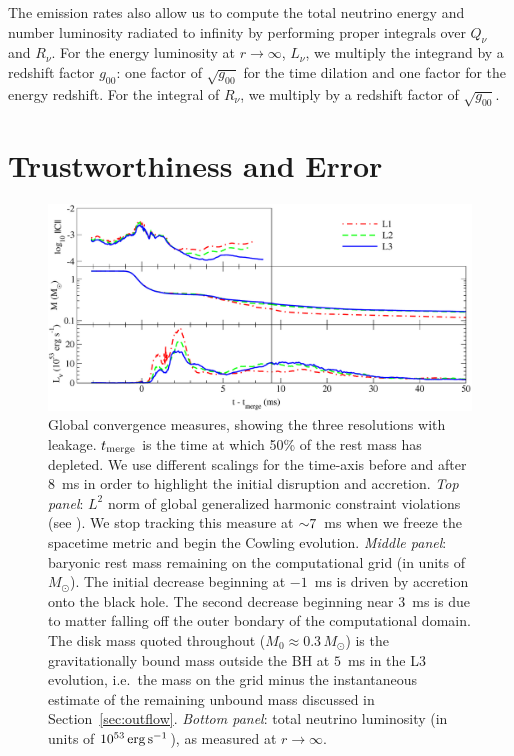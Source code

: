 The emission rates also allow us to compute the total neutrino energy
and number luminosity radiated to infinity by performing proper integrals
over $Q_{\nu}$ and $R_{\nu}$.  For the energy luminosity at $r\rightarrow\infty$, $L_{\nu}$,
we multiply the integrand by a redshift factor $g_{00}$:  one factor of
$\sqrt{g_{00}}$ for the time dilation and one factor for the energy redshift. 
For the integral of $R_{\nu}$, we multiply by a redshift factor of
$\sqrt{g_{00}}$.

\section{Trustworthiness and Error}
\label{sec:grhydroconvergence}

\begin{figure}[t] \centering
\includegraphics[width=18cm]{Figures/convergence_measures}
\caption[Global convergence measures]{
Global convergence measures,
showing the three resolutions with leakage.
$t_{\rm merge}$ is the time at which 50\% of the rest mass has depleted.
We use different scalings for the time-axis before and after 8~ms
in order to highlight the initial disruption and accretion.
{\em Top panel}: $L^2$ norm of global generalized harmonic constraint
violations (see \citealt{lind2007-gen_harmonic}). We stop tracking this measure at
$\mathord{\sim}7$~ms when we freeze the spacetime metric and begin the Cowling evolution.
{\em Middle panel}: baryonic rest mass remaining on the computational
grid (in units of $M_{\odot}$). The initial decrease beginning at $-1$~ms is
driven by accretion onto the black hole.
The second decrease beginning near $3$~ms is due to matter falling off the outer
bondary of the computational domain.
The disk mass quoted throughout ($M_0 \approx 0.3\,M_{\odot}$) is
the gravitationally bound mass outside the BH at $5$~ms in the L3 evolution,
i.e.\ the mass on the grid minus the instantaneous estimate of the remaining unbound mass
discussed in Section~\ref{sec:outflow}.
{\em Bottom panel}: total neutrino luminosity (in units of $10^{53}\rm\,erg\,s^{-1}$),
as measured at $r \rightarrow \infty$.
}
\label{fig:convergence}
\end{figure}

